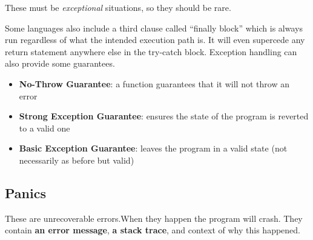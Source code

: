 These must be \textit{exceptional} situations, so they should be rare.

Some languages also include a third clause called ``finally block''
which is always run regardless of what the intended execution path is.
It will even supercede any return statement anywhere else in the
try-catch block. Exception handling can also provide some guarantees.
\begin{itemize}
  \item \textbf{No-Throw Guarantee}: a function guarantees that it will
  not throw an error
  \item \textbf{Strong Exception Guarantee}: ensures the state of the
  program is reverted to a valid one
  \item \textbf{Basic Exception Guarantee}: leaves the program in a
  valid state (not necessarily as before but valid)
\end{itemize}

\subsection*{Panics}
These are unrecoverable errors.When they happen the program will crash.
They contain \textbf{an error message}, \textbf{a stack trace}, and
context of why this happened.